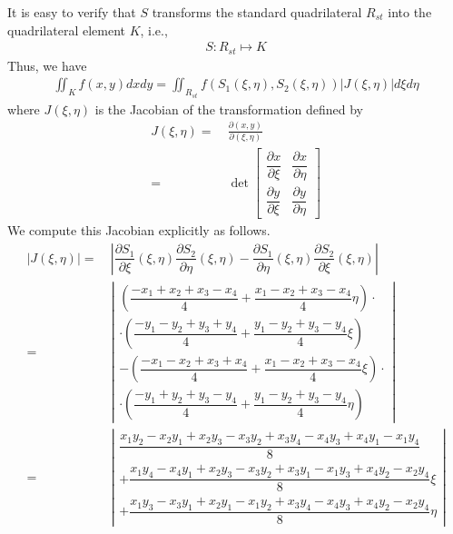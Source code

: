 \documentclass[a4paper]{article}
\numberwithin{equation}{section}
\begin{document}
It is easy to verify that $S$ transforms the standard quadrilateral $R_{st}$ into the quadrilateral element $K$, i.e.,
\begin{align}
S:{R_{st}} \mapsto K
\end{align}
Thus, we have
\begin{align}
\iint_K {f\left( {x,y} \right)dxdy} = \iint_{{R_{st}}} {f\left( {S_1\left( {\xi ,\eta } \right),S_2\left( {\xi ,\eta } \right)} \right)\left| {J\left( {\xi ,\eta } \right)} \right|d\xi d\eta }
\end{align}
where ${J\left( {\xi ,\eta } \right)}$ is the Jacobian of the transformation defined by
\begin{align}
J\left( {\xi ,\eta } \right) =&\ \frac{{\partial \left( {x,y} \right)}}{{\partial \left( {\xi ,\eta } \right)}}\\
 =&\ \det \left[ {\begin{array}{*{20}{c}}
{\dfrac{{\partial x}}{{\partial \xi }}}&{\dfrac{{\partial x}}{{\partial \eta }}}\\
{\dfrac{{\partial y}}{{\partial \xi }}}&{\dfrac{{\partial y}}{{\partial \eta }}}
\end{array}} \right]
\end{align}
We compute this Jacobian explicitly as follows.
\begin{align}
\left| {J\left( {\xi ,\eta } \right)} \right| =&\ \left| {\dfrac{{\partial {S_1}}}{{\partial \xi }}\left( {\xi ,\eta } \right)\dfrac{{\partial {S_2}}}{{\partial \eta }}\left( {\xi ,\eta } \right) - \dfrac{{\partial {S_1}}}{{\partial \eta }}\left( {\xi ,\eta } \right)\dfrac{{\partial {S_2}}}{{\partial \xi }}\left( {\xi ,\eta } \right)} \right|\\
=&\ \left| \begin{array}{l}
\left( {\dfrac{{ - {x_1} + {x_2} + {x_3} - {x_4}}}{4} + \dfrac{{{x_1} - {x_2} + {x_3} - {x_4}}}{4}\eta } \right) \cdot \\
 \cdot \left( {\dfrac{{ - {y_1} - {y_2} + {y_3} + {y_4}}}{4} + \dfrac{{{y_1} - {y_2} + {y_3} - {y_4}}}{4}\xi } \right)\\
 - \left( {\dfrac{{ - {x_1} - {x_2} + {x_3} + {x_4}}}{4} + \dfrac{{{x_1} - {x_2} + {x_3} - {x_4}}}{4}\xi } \right) \cdot \\
 \cdot \left( {\dfrac{{ - {y_1} + {y_2} + {y_3} - {y_4}}}{4} + \dfrac{{{y_1} - {y_2} + {y_3} - {y_4}}}{4}\eta } \right)
\end{array} \right|\\
=&\ \left| \begin{array}{l}
\dfrac{{{x_1}{y_2} - {x_2}{y_1} + {x_2}{y_3} - {x_3}{y_2} + {x_3}{y_4} - {x_4}{y_3} + {x_4}{y_1} - {x_1}{y_4}}}{8}\\
 + \dfrac{{{x_1}{y_4} - {x_4}{y_1} + {x_2}{y_3} - {x_3}{y_2} + {x_3}{y_1} - {x_1}{y_3} + {x_4}{y_2} - {x_2}{y_4}}}{8}\xi \\
 + \dfrac{{{x_1}{y_3} - {x_3}{y_1} + {x_2}{y_1} - {x_1}{y_2} + {x_3}{y_4} - {x_4}{y_3} + {x_4}{y_2} - {x_2}{y_4}}}{8}\eta 
\end{array} \right|
\end{align}
\end{document}
